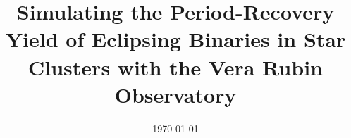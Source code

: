 \documentclass[twocolumn]{aastex63}
\date{\today}
\begin{document}
\title{Simulating the Period-Recovery Yield of Eclipsing Binaries in Star Clusters with the Vera Rubin Observatory}


\end{document}
